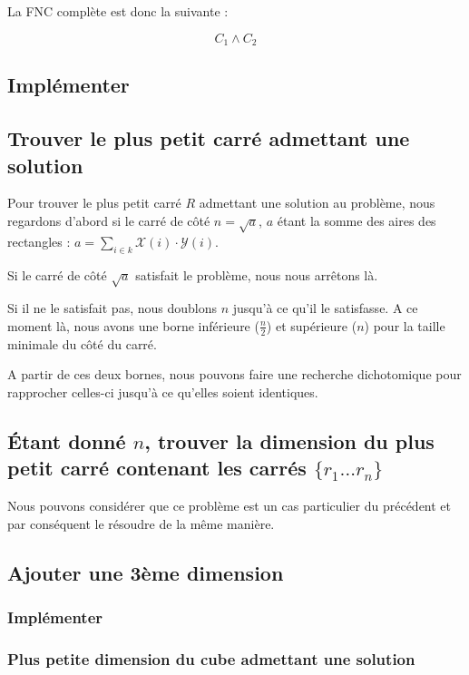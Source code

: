 \documentclass[a4paper]{article}
\begin{document}
La FNC complète est donc la suivante :

$$ C_1 \land C_2$$

\subsection{Implémenter}

\subsection{Trouver le plus petit carré admettant une solution}

Pour trouver le plus petit carré $R$ admettant une solution au problème, nous regardons d'abord si le carré de côté $n=\sqrt{a}$, $a$ étant la somme des aires des rectangles : $a = \sum_{i \in k} \mathcal{X}(i) \cdot \mathcal{Y}(i)$.

Si le carré de côté $\sqrt{a}$ satisfait le problème, nous nous arrêtons là.

Si il ne le satisfait pas, nous doublons $n$ jusqu'à ce qu'il le satisfasse. A ce moment là, nous avons une borne inférieure ($\frac{n}{2}$) et supérieure ($n$) pour la taille minimale du côté du carré.

A partir de ces deux bornes, nous pouvons faire une recherche dichotomique pour rapprocher celles-ci jusqu'à ce qu'elles soient identiques.

\subsection{Étant donné $n$, trouver la dimension du plus petit carré contenant les carrés $\{r_1 \ldots r_n \}$}

Nous pouvons considérer que ce problème est un cas particulier du précédent et par conséquent le résoudre de la même manière.

\subsection{Ajouter une 3ème dimension}

\subsubsection{Implémenter}
\subsubsection{Plus petite dimension du cube admettant une solution}
\end{document}
